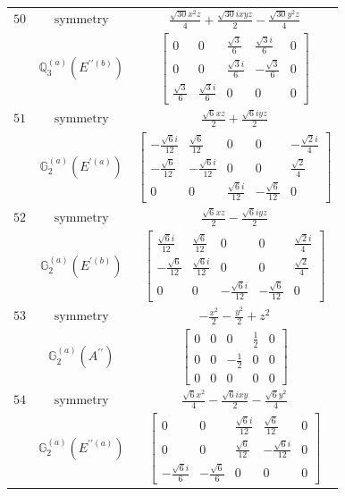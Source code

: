 \documentclass[fleqn,8pt,landscape]{jsarticle}
\begin{document}
\begin{longtable}{ccc}
$ 50 $ & $ \text{symmetry} $ & $ \frac{\sqrt{30} x^{2} z}{4} + \frac{\sqrt{30} i x y z}{2} - \frac{\sqrt{30} y^{2} z}{4} $ \\
$  $ & $ \mathbb{Q}_{3}^{(a)}(E^{\prime\prime(b)}) $ & $ \begin{bmatrix} 0 & 0 & \frac{\sqrt{3}}{6} & \frac{\sqrt{3} i}{6} & 0 \\ 0 & 0 & \frac{\sqrt{3} i}{6} & - \frac{\sqrt{3}}{6} & 0 \\ \frac{\sqrt{3}}{6} & \frac{\sqrt{3} i}{6} & 0 & 0 & 0 \end{bmatrix} $ \\ \hline
$ 51 $ & $ \text{symmetry} $ & $ \frac{\sqrt{6} x z}{2} + \frac{\sqrt{6} i y z}{2} $ \\
$  $ & $ \mathbb{G}_{2}^{(a)}(E^{\prime(a)}) $ & $ \begin{bmatrix} - \frac{\sqrt{6} i}{12} & \frac{\sqrt{6}}{12} & 0 & 0 & - \frac{\sqrt{2} i}{4} \\ - \frac{\sqrt{6}}{12} & - \frac{\sqrt{6} i}{12} & 0 & 0 & \frac{\sqrt{2}}{4} \\ 0 & 0 & \frac{\sqrt{6} i}{12} & - \frac{\sqrt{6}}{12} & 0 \end{bmatrix} $ \\ \hline
$ 52 $ & $ \text{symmetry} $ & $ \frac{\sqrt{6} x z}{2} - \frac{\sqrt{6} i y z}{2} $ \\
$  $ & $ \mathbb{G}_{2}^{(a)}(E^{\prime(b)}) $ & $ \begin{bmatrix} \frac{\sqrt{6} i}{12} & \frac{\sqrt{6}}{12} & 0 & 0 & \frac{\sqrt{2} i}{4} \\ - \frac{\sqrt{6}}{12} & \frac{\sqrt{6} i}{12} & 0 & 0 & \frac{\sqrt{2}}{4} \\ 0 & 0 & - \frac{\sqrt{6} i}{12} & - \frac{\sqrt{6}}{12} & 0 \end{bmatrix} $ \\ \hline
$ 53 $ & $ \text{symmetry} $ & $ - \frac{x^{2}}{2} - \frac{y^{2}}{2} + z^{2} $ \\
$  $ & $ \mathbb{G}_{2}^{(a)}(A^{\prime\prime}) $ & $ \begin{bmatrix} 0 & 0 & 0 & \frac{1}{2} & 0 \\ 0 & 0 & - \frac{1}{2} & 0 & 0 \\ 0 & 0 & 0 & 0 & 0 \end{bmatrix} $ \\ \hline
$ 54 $ & $ \text{symmetry} $ & $ \frac{\sqrt{6} x^{2}}{4} - \frac{\sqrt{6} i x y}{2} - \frac{\sqrt{6} y^{2}}{4} $ \\
$  $ & $ \mathbb{G}_{2}^{(a)}(E^{\prime\prime(a)}) $ & $ \begin{bmatrix} 0 & 0 & \frac{\sqrt{6} i}{12} & \frac{\sqrt{6}}{12} & 0 \\ 0 & 0 & \frac{\sqrt{6}}{12} & - \frac{\sqrt{6} i}{12} & 0 \\ - \frac{\sqrt{6} i}{6} & - \frac{\sqrt{6}}{6} & 0 & 0 & 0 \end{bmatrix} $ \\ \hline

\end{longtable}
\end{document}

